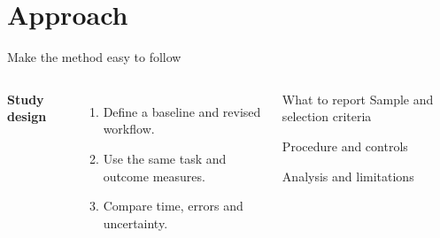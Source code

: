 \section{Approach}
\begin{frame}{Make the method easy to follow}
\begin{columns}[T,onlytextwidth]
\textbf{Study design}\par\vspace{3mm}
\begin{enumerate}\setlength{\itemsep}{4mm}
\item Define a baseline and revised workflow.
\item Use the same task and outcome measures.
\item Compare time, errors and uncertainty.
\end{enumerate}
\begin{block}{What to report}
Sample and selection criteria\par\medskip
Procedure and controls\par\medskip
Analysis and limitations
\end{block}
\end{columns}
\end{frame}

